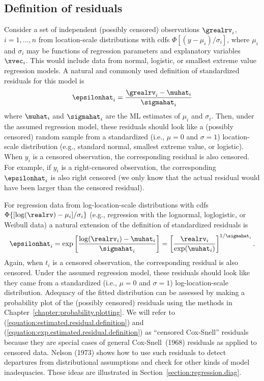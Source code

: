 \subsection{Definition of residuals}
\label{section:resid.def}
Consider a set of independent (possibly censored) observations
$\grealrv_{i}$, $i=1,\dots,n$ from location-scale distributions with
cdfs $\Phi[(y-\mu_{i})/\sigma_{i}]$, where $\mu_{i}$ and
$\sigma_{i}$ may be functions of regression parameters and
explanatory variables $\xvec_{i}$. This would include data from
normal, logistic, or smallest extreme value regression models. A
natural and commonly used definition of standardized residuals for
this model is
\begin{equation}
\label{equation:estimated.residual.definition}
\epsilonhat_{i}=
\frac{\grealrv_{i} - \muhat_{i}}{\sigmahat_{i}} 
\end{equation}
where $\muhat_{i}$ and $\sigmahat_{i}$ are the ML estimates of
$\mu_{i}$ and $\sigma_{i}$.  Then, under the assumed regression
model, these residuals should look like a (possibly censored) random
sample from a standardized (i.e., $\mu=0$ and $\sigma=1$)
location-scale distribution (e.g., standard normal, smallest extreme
value, or logistic).  When $y_{i}$ is a censored observation, the
corresponding residual is also censored. For example, if $y_{i}$ is
a right-censored observation, the corresponding $\epsilonhat_{i}$ is
also right censored (we only know that the actual residual would
have been larger than the censored residual).

For regression data from log-location-scale distributions with cdfs
$\Phi\{[\log(\realrv)-\mu_{i}]/\sigma_{i}\}$ (e.g., regression with
the lognormal, loglogistic, or Weibull data) a natural extension of
the definition of standardized residuals is
\begin{equation}
\label{equation:exp.estimated.residual.definition}
\epsilonhat_{i} = \exp \left [\frac{\log(\realrv_{i}) -
\muhat_{i}}{\sigmahat_{i}}\right]  = \left[ \frac{\realrv_{i}}
{\exp(\muhat_{i})}\right]^{1/\sigmahat_{i}}.
\end{equation}
Again, when $t_{i}$ is a censored observation, the corresponding
residual is also censored.  Under the assumed regression model,
these residuals should look like they came from a standardized
(i.e., $\mu=0$ and $\sigma=1$) log-location-scale distribution.
Adequacy of the fitted distribution can be assessed by making a
probability plot of the (possibly censored) residuals using the
methods in Chapter~\ref{chapter:probability.plotting}. We will refer
to (\ref{equation:estimated.residual.definition}) and
(\ref{equation:exp.estimated.residual.definition}) as ``censored
Cox-Snell'' residuals because they are special cases of general
Cox-Snell~(1968) residuals as applied to censored data. Nelson
(1973) shows how to use such residuals to detect departures from
distributional assumptions and check for other kinds of model
inadequacies.  These ideas are illustrated in
Section~\ref{section:regression.diag}.

